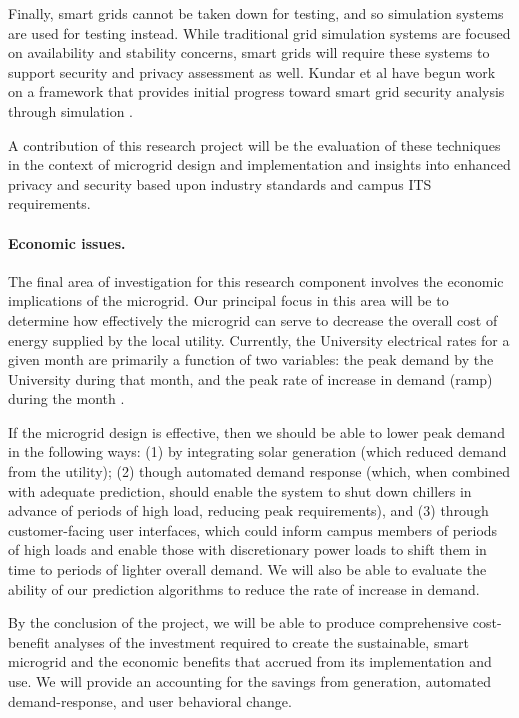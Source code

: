 Finally, smart grids cannot be taken down for testing, and so simulation
systems are used for testing instead.  While traditional grid simulation
systems are focused on availability and stability concerns, smart grids
will require these systems to support security and privacy assessment as
well. Kundar et al have begun work on a framework that provides initial
progress toward smart grid security analysis through simulation
\cite{Kundur2010}.

A contribution of this research project will be the evaluation of these
techniques in the context of microgrid design and implementation and
insights into enhanced privacy and security based upon industry standards and campus ITS requirements.

\paragraph{Economic issues.}

The final area of investigation for this research component involves the economic
implications of the microgrid.  Our principal focus in this area will be to
determine how effectively the microgrid can serve to decrease the overall
cost of energy supplied by the local utility.  Currently, the University
electrical rates for a given month are primarily a function of two
variables: the peak demand by the University during that month, and the
peak rate of increase in demand (ramp) during the month \cite{Hafner2011}.

If the microgrid design is effective, then we should be able to lower peak
demand in the following ways: (1) by integrating solar generation (which
reduced demand from the utility); (2) though automated demand response
(which, when combined with adequate prediction, should enable the system to
shut down chillers in advance of periods of high load, reducing peak
requirements), and (3) through customer-facing user interfaces, which could
inform campus members of periods of high loads and enable those with
discretionary power loads to shift them in time to periods of lighter
overall demand.
We will also be able to evaluate the ability of our prediction algorithms
to reduce the rate of increase in demand. 

By the conclusion of the project, we will be able to produce comprehensive
cost-benefit analyses of the investment required to create the sustainable,
smart microgrid and the economic benefits that accrued from its
implementation and use.  We will provide an accounting for the savings from
generation, automated demand-response, and user behavioral change.




  


